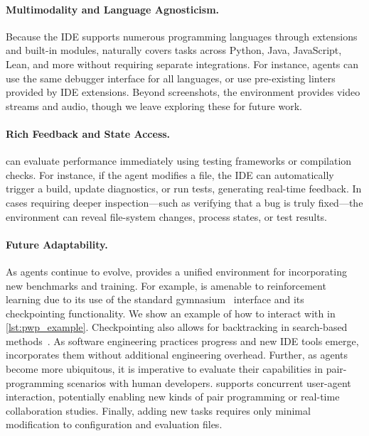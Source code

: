 \paragraph{Multimodality and Language Agnosticism.}
Because the IDE supports numerous programming languages through extensions and built-in modules, \ours{} naturally covers tasks across Python, Java, JavaScript, Lean, and more without requiring separate integrations. 
For instance, agents can use the same debugger interface for all languages, or use pre-existing linters provided by IDE extensions.
Beyond screenshots, the environment provides video streams and  audio, though we leave exploring these for future work.





\paragraph{Rich Feedback and State Access.}
\ours{} can evaluate performance immediately using testing frameworks or compilation checks.
For instance, if the agent modifies a file, the IDE can automatically trigger a build, update diagnostics, or run tests, generating real-time feedback.
In cases requiring deeper inspection—such as verifying that a bug is truly fixed—the environment can reveal file-system changes, process states, or test results.



\paragraph{Future Adaptability.}

As agents continue to evolve, \ours{} provides a unified environment for incorporating new benchmarks and training.
For example, \ours{} is amenable to reinforcement learning due to its use of the standard gymnasium~\cite{towers2024gymnasiumstandardinterfacereinforcement} interface and its checkpointing functionality. We show an example of how to interact with \ours{} in \autoref{lst:pwp_example}.
Checkpointing also allows for backtracking in search-based methods~\cite{Koh2024TreeSF,Putta2024AgentQA}. 
As software engineering practices progress and new IDE tools emerge, \ours{} incorporates them without additional engineering overhead. 
Further, as agents become more ubiquitous, it is imperative to evaluate their capabilities in pair-programming scenarios with human developers. 
\ours{} supports concurrent user-agent interaction, potentially enabling new kinds of pair programming or real-time collaboration studies. 
Finally, adding new tasks requires only minimal modification to configuration and evaluation files.


